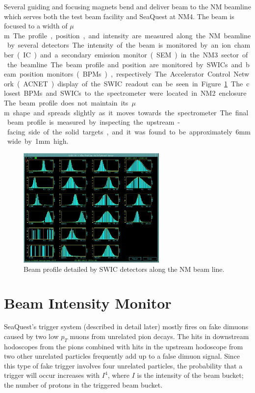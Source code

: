Several guiding and focusing magnets bend and deliver beam to the NM beamline which serves both the test beam facility and SeaQuest at NM4. The beam is focused to a width of \unit[250]{$\mu$m}. The profile, position, and intensity are measured along the NM beamline by several detectors. The intensity of the beam is monitored by an ion chamber (IC) and a secondary emission monitor (SEM) in the NM3 sector of the beamline. The beam profile and position are monitored by SWICs and beam position monitors (BPMs), respectively. The Accelerator Control Network (ACNET) display of the SWIC readout can be seen in Figure \ref{fig:Profile}. The closest BPMs and SWICs to the spectrometer were located in NM2 enclosure. The beam profile does not maintain its \unit[250]{$\mu$m} shape and spreads slightly as it moves towards the spectrometer. The final beam profile is measured by inspecting the upstream-facing side of the solid targets, and it was found to be approximately 6mm wide by 1mm high.

\begin{figure}
	\begin{center}
		\includegraphics[width=0.65\textwidth]{figures/apparatus/swic.jpg}
		\caption{Beam profile detailed by SWIC detectors along the NM beam line.}
		\label{fig:Profile}
	\end{center}
\end{figure}

\section{Beam Intensity Monitor}

SeaQuest's trigger system (described in detail later) mostly fires on fake dimuons caused by two low $p_T$ muons from unrelated pion decays. The hits in downstream hodoscopes from the pions combined with hits in the upstream hodoscope from two other unrelated particles frequently add up to a false dimuon signal. Since this type of fake trigger involves four unrelated particles, the probability that a trigger will occur increases with $I^4$, where $I$ is the intensity of the beam bucket; the number of protons in the triggered beam bucket.

